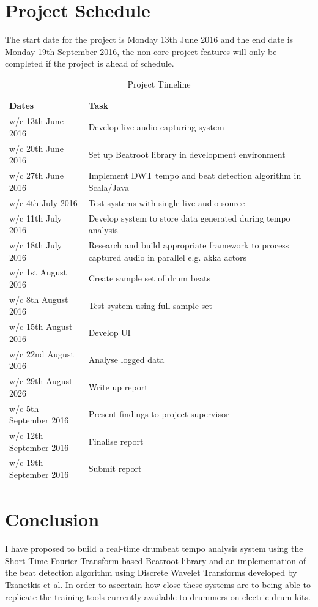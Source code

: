 \documentclass[a4paper, 11pt]{article}
\begin{document}
\section {Project Schedule}
The start date for the project is Monday 13th June 2016 and the end date is Monday 19th September 2016, the non-core project features will only be completed if the project is ahead of schedule.
\begin{table}[h]
\caption{Project Timeline} 
\centering
\begin{tabular}{|p{4cm}|p{8cm}|}
 \hline
\textbf{Dates} & \textbf{Task}\\ [0.5ex]
\hline 
w/c 13th June 2016 & Develop live audio capturing system\\
\hline 
w/c 20th June 2016 & Set up Beatroot library in development environment\\
\hline 
w/c 27th June 2016 & Implement DWT tempo and beat detection algorithm in Scala/Java\\
\hline 
w/c 4th July 2016 & Test systems with single live audio source\\
\hline 
w/c 11th July 2016 & Develop system to store data generated during tempo analysis\\
\hline 
w/c 18th July 2016 & Research and build appropriate framework to process captured audio in parallel e.g. akka actors\\
\hline 
w/c 1st August 2016 & Create sample set of drum beats\\
\hline 
w/c 8th August 2016 & Test system using full sample set\\
\hline 
w/c 15th August 2016 & Develop UI\\
\hline 
w/c 22nd August 2016 & Analyse logged data\\
\hline 
w/c 29th August 2026 & Write up report\\
\hline 
w/c 5th September 2016 & Present findings to project supervisor\\
\hline 
w/c 12th September 2016 & Finalise report\\
\hline 
w/c 19th September 2016 & Submit report\\
\hline
\end{tabular}
\end{table}
\clearpage
\maketitle{} 
\section{Conclusion}
I have proposed to build a real-time drumbeat tempo analysis system using the Short-Time Fourier Transform based Beatroot library and an implementation of the beat detection algorithm using Discrete Wavelet Transforms developed by Tzanetkis et al. In order to ascertain how close these systems are to being able to replicate the training tools currently available to drummers on electric drum kits.
\end{document}
